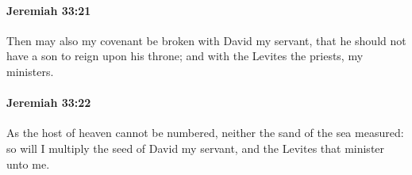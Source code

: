 		\paragraph{Jeremiah 33:21} %
			\label{JEREMIAH-33-21}

			Then may also my covenant be broken with David my servant, that he should not have a son to reign upon his throne; and with the Levites the priests, my ministers.


		\paragraph{Jeremiah 33:22} %
			\label{JEREMIAH-33-22}

			As the host of heaven cannot be numbered, neither the sand of the sea measured: so will I multiply the seed of David my servant, and the Levites that minister unto me.


